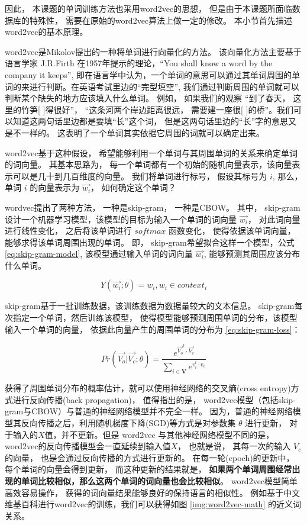 因此， 本课题的单词训练方法也采用word2vec的思想， 但是由于本课题所面临数据库的特殊性， 需要在原始的word2vec算法上做一定的修改。 本小节首先描述word2vec的基本原理。 


word2vec是Mikolov提出的一种将单词进行向量化的方法。 该向量化方法主要基于语言学家 J.R.Firth 在1957年提示的理论，“You shall know a word by the company it keeps”, 即在语言学中认为，一个单词的意思可以通过其单词周围的单词的来进行判断。在英语考试里边的“完型填空”, 我们通过判断周围的单词就可以判断某个缺失的地方应该填入什么单词。 例如， 如果我们的观察 “到了春天， 这里的竹笋[ ]得很好”， “这条河两个岸边距离很远， 需要建一座很[ ]的桥”。我们可以知道这两句话里边都是要填“长”这个词， 但是这两句话里边的“长”字的意思又是不一样的。 这表明了一个单词其实依据它周围的词就可以确定出来。 

word2vec基于这种假设， 希望能够利用一个单词与其周围单词的关系来确定单词的词向量。 其基本思路为， 每一个单词都有一个初始的随机向量表示，该向量表示可以是几十到几百维度的向量。 我们将单词进行标号， 假设其标号为 $i$, 那么， 单词 $i$ 的向量表示为 $\vec{w_i}$， 如何确定这个单词？ 

wordvec提出了两种方法， 一种是skip-gram， 一种是CBOW。 其中， skip-gram设计一个机器学习模型，该模型的目标为输入一个单词的词向量 $\vec{w_i}$， 对此词向量进行线性变化， 之后将该单词进行 $softmax$ 函数变化， 使得依据该单词向量，能够求得该单词周围出现的单词。 即， skip-gram希望拟合这样一个模型，公式 \ref{eq:skip-gram-model}, 该模型通过输入单词的词向量 $\vec{w_i}$, 能够预测其周围应该分布什么单词。 

\begin{equation} 
Y(\vec{w_i}; \theta) = w_i,  w_i \in context_i
\end{equation}

skip-gram基于一批训练数据，该训练数据为数据量较大的文本信息。 skip-gram每次指定一个单词，然后训练该模型， 使得模型能够预测周围单词的分布，该模型输入一个单词的向量， 依据此向量产生的周围单词的分布为 \ref{eq:skip-gram-loss}： 

\begin{equation} \label{eq:skip-gram-loss}
Pr(\vec{V_o} | \vec{V_c} ; \theta ) = \frac{e^{ \vec{V_o}^t \cdot \vec{V_c}}}{\sum_{i \in \mathbf{V}}{e^{v_i^t \cdot v_c}}}
\end{equation}

获得了周围单词分布的概率估计，就可以使用神经网络的交叉熵(cross entropy)方式进行反向传播(back propagation)， 值得指出的是， word2vec模型（包括skip-gram与CBOW）与普通的神经网络模型并不完全一样。 因为，普通的神经网络模型其反向传播之后，利用随机梯度下降(SGD)等方式是对参数集 $\theta$ 进行更新， 对于输入的$X$值，并不更新。但是 word2vec 与其他神经网络模型不同的是，word2vec的反向传播模型会一直延续到输入值$X$， 也就是说， 其每一次的输入 $V_c$ 的向量， 也是会通过反向传播的方式进行更新的。 在每一轮(epoch)的更新中， 每个单词的向量会得到更新， 而这种更新的结果就是， \textbf{如果两个单词周围经常出现的单词比较相似，那么这两个单词的词向量也会比较相似}。 word2vec模型简单高效容易操作， 获得的词向量结果能够良好的保持语言的相似性。 例如基于中文维基百科进行word2vec的训练，我们可以获得如图 \ref{img:word2vec-math} 的近义词关系。 


